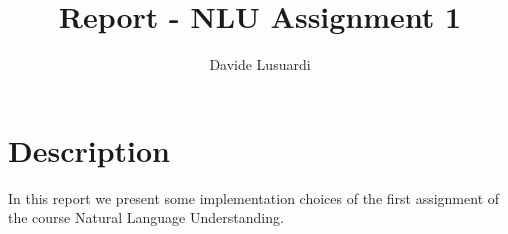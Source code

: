\documentclass{article}
\begin{document}
\title{Report - NLU Assignment 1\\
}


\author{Davide Lusuardi}

\begin{titlepage}
    \maketitle
\end{titlepage}



\section{Description}
In this report we present some implementation choices of the first assignment of the course Natural Language Understanding.
\end{document}
